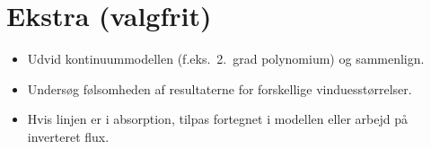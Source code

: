 \documentclass[11pt,a4paper]{article}
\begin{document}
\section*{Ekstra (valgfrit)}
\begin{itemize}
\item Udvid kontinuum\-modellen (f.eks.\ 2.~grad polynomium) og sammenlign.
\item Undersøg følsomheden af resultaterne for forskellige vinduesstørrelser.
\item Hvis linjen er i absorption, tilpas fortegnet i modellen eller arbejd på inverteret flux.
\end{itemize}
\end{document}
